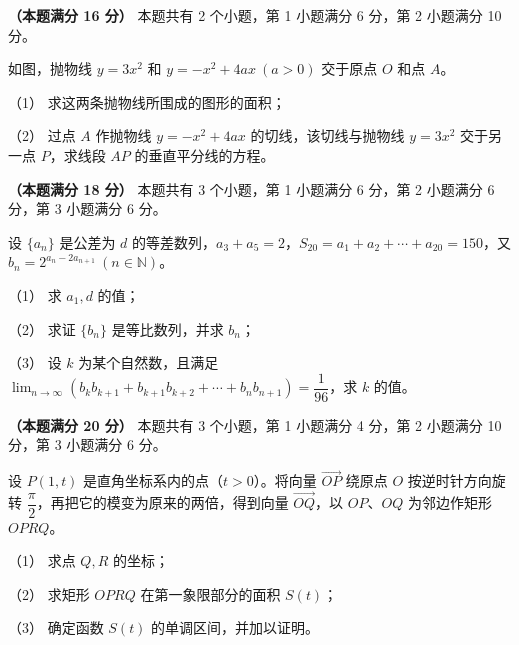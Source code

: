\Needspace{0.4\textheight}
\begin{question}
\textbf{（本题满分 16 分）} 本题共有 2 个小题，第 1 小题满分 6 分，第 2 小题满分 10 分。

如图，抛物线 $y=3x^2$ 和 $y=-x^2+4ax\ (a>0)$ 交于原点 $O$ 和点 $A$。

（1） 求这两条抛物线所围成的图形的面积；

（2） 过点 $A$ 作抛物线 $y=-x^2+4ax$ 的切线，该切线与抛物线 $y=3x^2$ 交于另一点 $P$，求线段 $AP$ 的垂直平分线的方程。
\nopagebreak[4]
\begin{center}\end{center}
\nopagebreak[4]
\end{question}
\begin{question}
\textbf{（本题满分 18 分）} 本题共有 3 个小题，第 1 小题满分 6 分，第 2 小题满分 6 分，第 3 小题满分 6 分。

设 $\{a_n\}$ 是公差为 $d$ 的等差数列，$a_3+a_5=2$，$S_{20}=a_1+a_2+\cdots+a_{20}=150$，又 $b_n=2^{a_n-2a_{n+1}}\ (n\in\mathbb N)$。

（1） 求 $a_1,d$ 的值；

（2） 求证 $\{b_n\}$ 是等比数列，并求 $b_n$；

（3） 设 $k$ 为某个自然数，且满足 $\displaystyle\lim_{n\to\infty}(b_kb_{k+1}+b_{k+1}b_{k+2}+\cdots+b_nb_{n+1})=\dfrac1{96}$，求 $k$ 的值。

\end{question}
\begin{question}
\textbf{（本题满分 20 分）} 本题共有 3 个小题，第 1 小题满分 4 分，第 2 小题满分 10 分，第 3 小题满分 6 分。

设 $P(1,t)$ 是直角坐标系内的点（$t>0$）。将向量 $\overrightarrow{OP}$ 绕原点 $O$ 按逆时针方向旋转 $\dfrac\pi2$，再把它的模变为原来的两倍，得到向量 $\overrightarrow{OQ}$，以 $OP$、$OQ$ 为邻边作矩形 $OPRQ$。

（1） 求点 $Q,R$ 的坐标；

（2） 求矩形 $OPRQ$ 在第一象限部分的面积 $S(t)$；

（3） 确定函数 $S(t)$ 的单调区间，并加以证明。

\end{question}